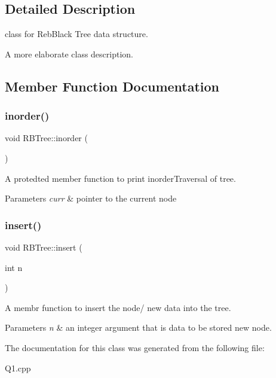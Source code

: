 \subsection{Detailed Description}
class for Reb\+Black Tree data structure. 

A more elaborate class description. 

\subsection{Member Function Documentation}
\mbox{\label{classRBTree_aff8e5c4479e6708da9a6cbfc276836a3}} 
\subsubsection{\texorpdfstring{inorder()}{inorder()}}
{\footnotesize\ttfamily void R\+B\+Tree\+::inorder (\begin{DoxyParamCaption}{ }\end{DoxyParamCaption})}



A protedted member function to print inorder\+Traversal of tree. 


\begin{DoxyParams}{Parameters}
{\em curr} & pointer to the current node \\
\hline
\end{DoxyParams}
\mbox{\label{classRBTree_a4b8c33ea38498194b3f31876283058ec}} 
\subsubsection{\texorpdfstring{insert()}{insert()}}
{\footnotesize\ttfamily void R\+B\+Tree\+::insert (\begin{DoxyParamCaption}\item[{int}]{n }\end{DoxyParamCaption})}



A membr function to insert the node/ new data into the tree. 


\begin{DoxyParams}{Parameters}
{\em n} & an integer argument that is data to be stored new node. \\
\hline
\end{DoxyParams}


The documentation for this class was generated from the following file\+:\begin{DoxyCompactItemize}
\item 
Q1.\+cpp\end{DoxyCompactItemize}
